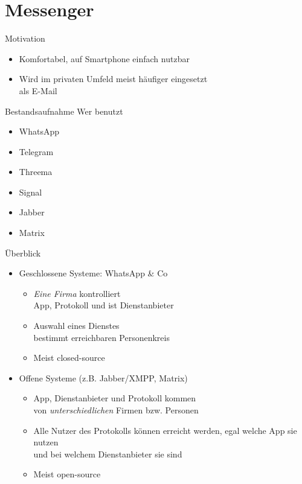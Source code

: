 \section{Messenger}
\begin{frame}{Motivation}
  \begin{itemize}
    \item Komfortabel, auf Smartphone einfach nutzbar
    \item Wird im privaten Umfeld meist häufiger eingesetzt\\ als E-Mail
  \end{itemize}

  \pause
  \begin{block}{Bestandsaufnahme}
    Wer benutzt
    \begin{itemize}
      \item<+-> WhatsApp
      \item<+-> Telegram
      \item<+-> Threema
      \item<+-> Signal
      \item<+-> Jabber
      \item<+-> Matrix
    \end{itemize}
  \end{block}
\end{frame}

\begin{frame}{Überblick}
  \begin{itemize}
    \item Geschlossene Systeme: WhatsApp \& Co
      \begin{itemize}
        \item \emph{Eine Firma} kontrolliert\\ App, Protokoll und ist Dienstanbieter
        \item Auswahl eines Dienstes\\bestimmt erreichbaren Personenkreis
        \item Meist closed-source
      \end{itemize}
    \item Offene Systeme (z.B. Jabber/XMPP, Matrix)
      \begin{itemize}
        \item App, Dienstanbieter und Protokoll kommen\\ von \emph{unterschiedlichen} Firmen bzw. Personen
        \item Alle Nutzer des Protokolls können erreicht werden, egal welche App sie nutzen\\ und bei welchem Dienstanbieter sie sind
        \item Meist open-source
      \end{itemize}
  \end{itemize}
\end{frame}

